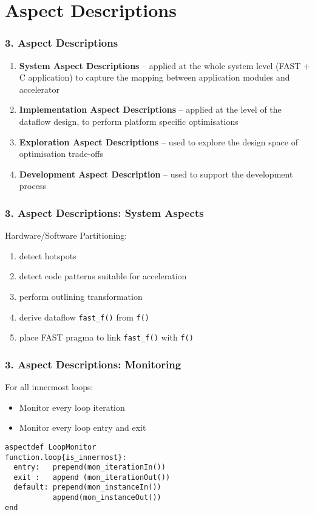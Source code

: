 \section{Aspect Descriptions}
\begin{frame}
  \frametitle{3. Aspect Descriptions}
  \begin{enumerate}
  \setlength{\itemsep}{15pt}
  \item \textbf{System Aspect Descriptions} -- applied at the whole
    system level (FAST + C application) to capture the mapping
    between application modules and accelerator
  \item \textbf{Implementation Aspect Descriptions} -- applied at the
    level of the dataflow design, to perform platform specific
    optimisations
  \item \textbf{Exploration Aspect Descriptions} -- used to explore the
    design space of optimisation trade-offs
  \item \textbf{Development Aspect Description}  -- used to support
    the development process
  \end{enumerate}
\end{frame}

\begin{frame}
  \frametitle{3. Aspect Descriptions: System Aspects}
  Hardware/Software Partitioning:
  \begin{enumerate}
  \setlength{\itemsep}{10pt}
  \item detect hotspots
  \item detect code patterns suitable for acceleration
  \item perform outlining transformation
  \item derive dataflow \texttt{fast\_f()} from \texttt{f()}
  \item place FAST pragma to link \texttt{fast\_f()} with \texttt{f()}
  \end{enumerate}
\end{frame}


\begin{frame}[fragile]
  \frametitle{3. Aspect Descriptions: Monitoring}
  For all innermost loops:
  \begin{itemize}
  \item Monitor every loop iteration
  \item Monitor every loop entry and exit
  \end{itemize}
  \begin{lstlisting}[label=lst:label, style=lara]
aspectdef LoopMonitor
function.loop{is_innermost}:
  entry:   prepend(mon_iterationIn())
  exit :   append (mon_iterationOut())
  default: prepend(mon_instanceIn())
           append(mon_instanceOut())
end
  \end{lstlisting}
\end{frame}

